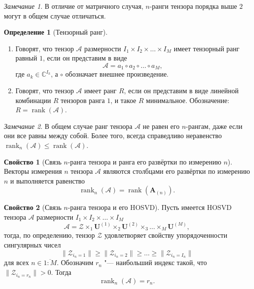 \documentclass[specialist,
    substylefile = spbu_report.rtx,
    subf,href,colorlinks=true, 12pt]{disser}
\theoremstyle{plain}
\theoremstyle{definition}
\newtheorem{definition}{Определение}[section]
\newtheorem{property}{Свойство}[section]
\theoremstyle{remark}
\newtheorem*{remark}{Замечание}
\begin{document}
    \begin{remark}
        В отличие от матричного случая, $n$-ранги тензора порядка выше $2$ могут в общем случае отличаться.
    \end{remark}

    \begin{definition}[Тензорный ранг]
        \leavevmode
        \begin{enumerate}
            \item Говорят, что тензор $\mathcal{A}$ размерности $I_1\times I_2\times \ldots \times I_M$ имеет тензорный ранг равный $1$, если он представим в виде
            \[
                \mathcal{A}=a_1\circ a_2\circ \ldots \circ a_M,
            \]
            где $a_{k} \in \mathbb{C}^{I_k}$, а $\circ$ обозначает внешнее произведение.
            \item Говорят, что тензор $\mathcal{A}$ имеет ранг $R$, если он представим в виде линейной комбинации $R$ тензоров
            ранга $1$, и такое $R$ минимальное.
            Обозначение: $R=\operatorname{rank}(\mathcal{A})$.
        \end{enumerate}
    \end{definition}

    \begin{remark}
        В общем случае ранг тензора $\mathcal{A}$ не равен его $n$-рангам, даже если они все равны между собой.
        Более того, всегда справедливо неравенство $\operatorname{rank}_n(\mathcal{A})\leqslant \operatorname{rank}(\mathcal{A})$.
    \end{remark}

    \begin{property}
    [Связь $n$-ранга тензора и ранга его развёртки по измерению $n$]
        Векторы измерения $n$ тензора $\mathcal{A}$ являются столбцами его развёртки по измерению $n$ и выполняется равенство
        \[\operatorname{rank}_{n}(\mathcal{A})=\operatorname{rank}(\mathbf{A}_{(n)}).\]
    \end{property}

    \begin{property}
    [Связь $n$-ранга тензора и его HOSVD]
        \label{property:n-rank}
        Пусть имеется HOSVD тензора $\mathcal{A}$ размерности $I_1\times I_2\times \ldots \times I_M$
        \[\mathcal{A} = \mathcal{Z}\times_1 \mathbf{U}^{(1)}\times_2\mathbf{U}^{(2)}\times_3\ldots \times_{M}\mathbf{U}^{(M)},\]
        тогда, по определению, тензор $\mathcal{Z}$ удовлетворяет свойству упорядоченности сингулярных чисел
        \[\|\mathcal{Z}_{i_n=1}\|\geqslant\|\mathcal{Z}_{i_n=2}\|\geqslant\ldots \geqslant \|\mathcal{Z}_{i_n=I_n}\|\]
        для всех $n\in \overline{1:M}$.
        Обозначим $r_n$ "--- наибольший индекс такой, что $\|\mathcal{Z}_{i_n=r_n}\|>0$.
        Тогда
        \begin{equation}
            \operatorname{rank}_n(\mathcal{A})=r_n.\label{eq:n-rank}
        \end{equation}
    \end{property}
\end{document}
